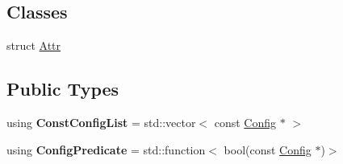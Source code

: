 \subsection*{Classes}
\begin{DoxyCompactItemize}
\item 
struct \hyperlink{structtheoria_1_1config_1_1Config_1_1Attr}{Attr}
\end{DoxyCompactItemize}
\subsection*{Public Types}
\begin{DoxyCompactItemize}
\item 
\hypertarget{classtheoria_1_1config_1_1Config_a61230728ffa4d92667a536c8c0f0ca30}{using {\bfseries Const\+Config\+List} = std\+::vector$<$ const \hyperlink{classtheoria_1_1config_1_1Config}{Config} $\ast$ $>$}\label{classtheoria_1_1config_1_1Config_a61230728ffa4d92667a536c8c0f0ca30}

\item 
\hypertarget{classtheoria_1_1config_1_1Config_a293ebfd7146d935e232a066f7e6fa279}{using {\bfseries Config\+Predicate} = std\+::function$<$ bool(const \hyperlink{classtheoria_1_1config_1_1Config}{Config} $\ast$)$>$}\label{classtheoria_1_1config_1_1Config_a293ebfd7146d935e232a066f7e6fa279}

\end{DoxyCompactItemize}
